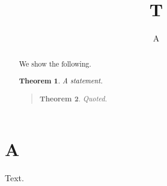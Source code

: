 \documentclass{article}
\newtheorem{theorem}{Theorem}
\begin{document}
\title{T}\author{A}
\begin{abstract}
We show the following.
\begin{theorem} A statement. \end{theorem}
\begin{quote}
\begin{theorem} Quoted. \end{theorem}
\end{quote}
\end{abstract}
\maketitle
\section{A}
Text.
\end{document}

